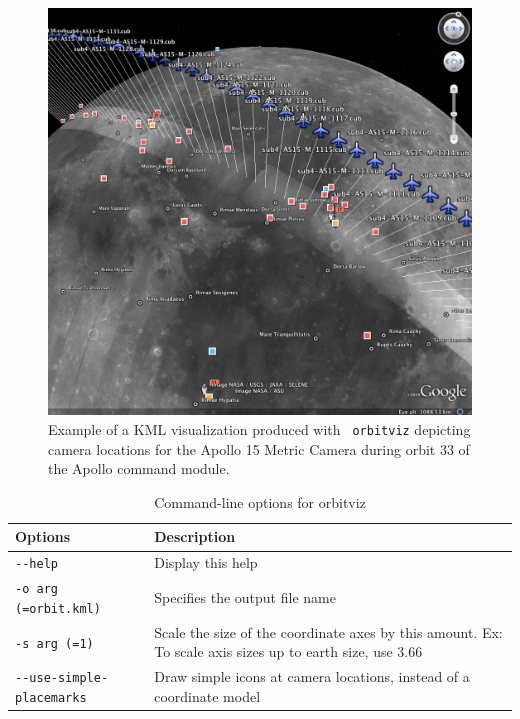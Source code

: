 \begin{figure}[ht]
  \begin{center}
  \includegraphics[width=6in]{images/orbitviz_ge_result.png}
  \end{center}
  \caption{ Example of a KML visualization produced with {\tt
      orbitviz} depicting camera locations for the Apollo 15 Metric
    Camera during orbit 33 of the Apollo command module.}
  \label{fig:orbitviz_example}
\end{figure}

\begin{longtable}{|l|p{10cm}|}
\caption{Command-line options for orbitviz}
\label{tbl:orbitviz}
\endfirsthead
\endhead
\endfoot
\endlastfoot
\hline
Options & Description \\ \hline \hline
\verb#--help# & Display this help \\ \hline
\verb#-o arg (=orbit.kml)# & Specifies the output file name \\ \hline
\verb#-s arg (=1)# & Scale the size of the coordinate axes by this amount. Ex: To scale axis sizes up to earth size, use 3.66 \\ \hline
\verb#--use-simple-placemarks# & Draw simple icons at camera locations, instead of a coordinate model \\ \hline
\end{longtable}


